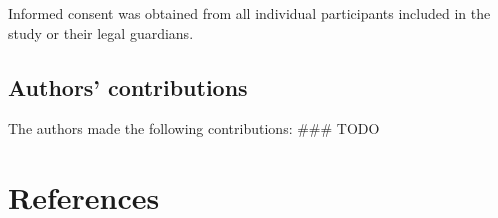 \documentclass[
  man,floatsintext]{apa6}
\begin{document}
Informed consent was obtained from all individual participants included in the study or their legal guardians.

\hypertarget{authors-contributions}{%
\subsection{Authors' contributions}\label{authors-contributions}}

The authors made the following contributions: \#\#\# TODO

\newpage

\hypertarget{references}{%
\section{References}\label{references}}

\begingroup
\setlength{\parindent}{-0.5in}
\setlength{\leftskip}{0.5in}
\end{document}
